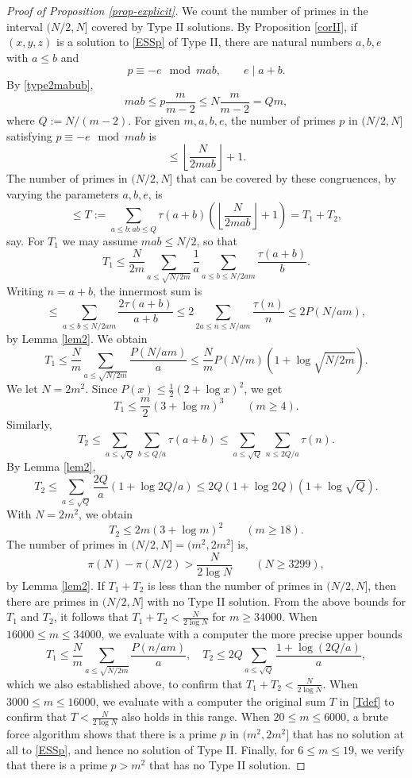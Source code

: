 \documentclass[12pt]{amsart}
\theoremstyle{definition}
\theoremstyle{remark}
\numberwithin{equation}{section}
\begin{document}
\begin{proof}[Proof of Proposition \ref{prop-explicit}]
We count the number of primes in the interval $(N/2 ,N]$ covered by Type II solutions.
By Proposition \ref{corII}, if $(x,y,z)$ is a solution to \eqref{ESSp} of Type II, there are natural numbers $a,b,e$ with
$a\le b$ and 
$$
p\equiv - e \mod mab, \qquad e\mid a+b.
$$
By \eqref{type2mabub}, 
$$
mab \le p \frac{m}{m-2} \le N \frac{m}{m-2} = Qm,
$$
where $Q:= N/(m-2)$. 
For given $m,a,b,e$, the number of primes $p$ in $(N/2, N]$ satisfying $p\equiv - e \mod mab$ is 
$$
\le \left\lfloor \frac{N}{2mab}\right\rfloor+1.
$$
The number of primes in $(N/2,N]$ that can be covered by these congruences, by varying the parameters $a, b, e$, is
\begin{equation}\label{Tdef}
\le T:= \sum_{a\le b: ab \le Q } \tau(a+b)\left(\left\lfloor \frac{N}{2mab}\right\rfloor+1\right)=  T_1+T_2,
\end{equation}
say. 
For $T_1$ we may assume $mab\le N/2$, so that
$$
T_1 \le \frac{N}{2m}\sum_{a\le \sqrt{N/2m}} \frac{1}{a} \sum_{a \le b \le N/2am} \frac{\tau(a+b)}{b}.
$$
Writing $n=a+b$, the innermost sum is 
$$
\le \sum_{a \le b \le N/2am} \frac{2\tau(a+b)}{a+b} \le 2\sum_{2a \le n \le N/am} \frac{\tau(n)}{n}
\le 2 P(N/am),
$$
by Lemma \ref{lem2}. We obtain
$$
T_1 \le \frac{N}{m} \sum_{a\le \sqrt{N/2m}} \frac{P(N/am)}{a} \le 
\frac{N}{m}P(N/m)(1+\log \sqrt{N/2m}) .
$$
We let $N=2m^2$. Since $P(x)\le \frac{1}{2}(2+\log x)^2$, we get 
$$
T_1 \le \frac{m}{2}(3+\log m)^3 \qquad (m\ge 4).
$$
Similarly, 
$$
T_2 \le \sum_{a \le \sqrt{Q}} \sum_{b\le Q/a} \tau(a+b) \le \sum_{a \le \sqrt{Q}} \sum_{n\le 2Q/a} \tau(n).
$$
By Lemma \ref{lem2},
$$
T_2 \le \sum_{a \le \sqrt{Q}} \frac{2Q}{a}(1+\log 2Q/a) \le 2Q (1+\log 2Q)(1+\log \sqrt{Q}).
$$
With $N=2m^2$, we obtain
$$
T_2 \le 2m(3+\log m)^2 \qquad (m\ge 18). 
$$
The number of primes in $(N/2,N]=(m^2,2m^2]$ is, 
$$
\pi(N)-\pi(N/2)>\frac{N}{2\log N} \qquad (N\ge  3299),
$$
by Lemma \ref{lem2}.
If $T_1+T_2 $  is less than the number of primes in $(N/2,N]$, then there
are primes in $(N/2,N]$ with no Type II solution.
From the above bounds for $T_1$ and $T_2$, it follows that $T_1+T_2<\frac{N}{2\log N}$ for $m\ge 34000$.
When $16000\le m \le 34000$, we evaluate with a computer the more precise upper bounds
$$
T_1 \le \frac{N}{m} \sum_{a\le \sqrt{N/2m}} \frac{P(n/am)}{a},
\quad
T_2 \le 2Q \sum_{a\le \sqrt{Q}} \frac{1+\log(2Q/a)}{a},
$$
which we also established above, to confirm that $T_1+T_2<\frac{N}{2\log N}$.
When $3000\le m \le 16000$, we evaluate with a computer the original sum $T$ in \eqref{Tdef}
to confirm that $T<\frac{N}{2\log N}$ also holds in this range. 
When $20\le m \le 6000$, a brute force algorithm shows that there is a prime $p$ in $(m^2, 2m^2]$ that has no solution at all to \eqref{ESSp},
and hence no solution of Type II.
Finally, for $6\le m \le 19$, we verify that there is a prime $p>m^2$ that has no Type II solution.
\end{proof}
\end{document}
